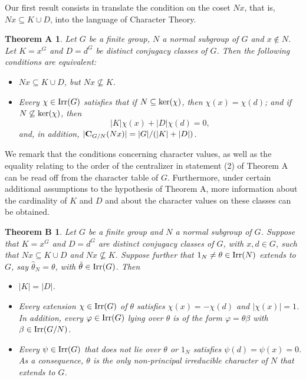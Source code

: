 \documentclass[12pt,leqno,a4paper]{amsart}
\newtheorem*{thmA}{Theorem A}
\newtheorem*{thmB}{Theorem B}
\numberwithin{equation}{section}
\begin{document}
\medskip
Our first result consists in translate the condition on the coset $Nx$, that  is,  $Nx\subseteq K \cup D$, into the language of  Character Theory.

\begin{thmA} Let $G$ be a finite group, $N$ a normal subgroup of $G$ and $x\not\in N$. Let $K =x^G$ and $D=d^G$ be distinct conjugacy classes of $G$. Then the following conditions  are equivalent:

 \begin{itemize}
 \item[(1)] $Nx \subseteq K \cup D$, but $Nx \not\subseteq K$.
 \item[(2)] Every  $\chi \in {\rm Irr}(G)$ satisfies that if $N\subseteq {\rm ker}(\chi)$, then $\chi(x)=\chi(d)$; and if $N\not\subseteq {\rm ker}(\chi)$, then
 $$|K|\chi(x) +|D|\chi(d)=0,$$
 and, in addition, $|{\bf C}_{G/N}(Nx)|= |G|/(|K|+|D|)$.
\end{itemize}
\end{thmA}

We remark that the conditions concerning character values, as well as the equality relating to the order of the centralizer in statement (2)  of Theorem A can be read off from the character table of $G$. Furthermore, under certain additional assumptions to the hypothesis of Theorem A,  more information about the cardinality of $K$ and $D$ and about the character values on these classes can be obtained.

\begin{thmB} Let $G$ be a finite group and $N$ a normal subgroup of $G$. Suppose that $K =x^G$ and $D=d^G$ are distinct conjugacy classes of $G$, with $x,d \in G$, such that $Nx\subseteq K \cup D$ and $Nx \not\subseteq K$.  Suppose further that $1_N\neq \theta \in {\rm Irr}(N)$ extends to $G$, say $\hat{\theta}_N=\theta$, with $\hat{\theta}\in {\rm Irr}(G)$. Then
\begin{itemize}
\item[(1)] $|K|=|D|$.
\item[(2)] Every extension $\chi\in {\rm Irr}(G)$ of $\theta$  satisfies  $\chi(x)=-\chi(d)$ and $|\chi(x)|=1$. In addition, every $\varphi\in {\rm Irr}(G)$ lying over $\theta$ is of the form $\varphi=\hat{\theta}\beta$
  with $\beta\in {\rm Irr}(G/N)$.
\item[(3)]
Every $\psi\in{\rm Irr}(G)$ that does not lie over $\theta$ or $1_N$ satisfies $\psi(d)=\psi(x)=0$. As a consequence, $\theta$ is the only non-principal irreducible character of $N$ that extends to $G$.
\end{itemize}
\end{thmB}
\end{document}

